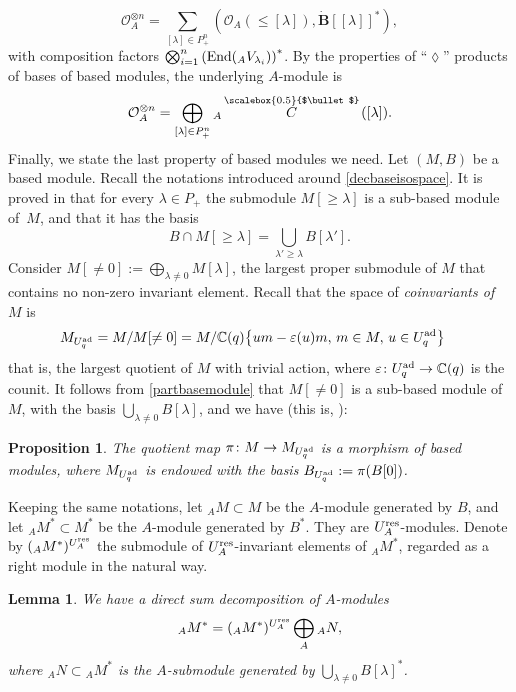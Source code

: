 \documentclass[pdftex]{sigma}
\numberwithin{equation}{section}
\newtheorem{lem}[teo]{Lemma}
\newtheorem{prop}[teo]{Proposition}
\theoremstyle{definition}
\newcommand{\mc}{\mathbb{C}}
\newcommand{\Oo}{{\mathcal O}}
\newcommand{\ra}{\rightarrow}
\newcommand{\smallbullet}{%
\vcenter{\hbox{\,\scalebox{0.5}{$\bullet$}\,}}
}
\begin{document}
\begin{equation}\label{decompositionOAcoad}
\Oo_A^{\otimes n} = \sum_{[\lambda] \in P_+^n} (\Oo_A(\leq [\lambda]), \dot{\mathbf{B}} [[\lambda]]^*),
\end{equation}
with composition factors $ \bigotimes_{i=1}^n \left({\rm End}({}_A V_{\lambda_i})\right)^*$. By the properties of ``$\lozenge$'' products of bases of based modules, the underlying $A$-module is
\begin{equation}\label{decompositionOA2}
\Oo_A^{\otimes n} = \bigoplus_{[\lambda] \in P_+^n} {}_A \overset{\raisebox{-1.5pt}{\scriptsize$\smallbullet$}}{C} ([\lambda]).
\end{equation}
Finally, we state the last property of based modules we need. Let $(M,B)$ be a based module. Recall the notations introduced around \eqref{decbaseisospace}. It is proved in \cite[Proposition 27.1.8]{Lusztig} that for every $\lambda\in P_+$ the submodule $M[\geq\lambda]$ is a sub-based module of~$M$, and that it has the basis
\begin{equation}\label{partbasemodule}
B\cap M[\geq\lambda] = \bigcup_{\lambda'\geq \lambda} B[\lambda'].
\end{equation}
Consider $M[\ne 0] := \bigoplus_{\lambda\ne 0} M[\lambda]$, the largest proper submodule of $M$ that contains no non-zero invariant element. Recall that the space of {\it coinvariants of} $M$ is
\begin{align*} M_{U_q^{\rm ad}} & = M/ M[\ne 0] = M/\mc(q)\big\{um-\varepsilon(u)m, \,m\in M, \,u\in U_q^{\rm ad}\big\}
\end{align*}
that is, the largest quotient of $M$ with trivial action, where $\varepsilon\colon U_q^{\rm ad}\ra \mc(q)$ is the counit. It follows from \eqref{partbasemodule} that $M[\ne 0]$ is a sub-based module of $M$, with the basis $\bigcup_{\lambda\ne 0} B[\lambda]$, and we have (this is, \cite[Proposition~27.2.6]{Lusztig}):
\begin{prop}\label{Linvbased} The quotient map $\pi\colon M \ra M_{U_q^{\rm ad}}$ is a morphism of based modules, where $M_{U_q^{\rm ad}}$ is endowed with the basis $B_{U_q^{\rm ad}} := \pi(B[0])$.
\end{prop}
Keeping the same notations, let ${}_AM \subset M$ be the $A$-module generated by $B$, and let ${{}_AM^* \subset M^*}$ be the $A$-module generated by $B^*$. They are $U_A^{\rm res}$-modules. Denote by $({}_A M^*)^{U_A^{\rm res}}$ the submodule of $U_A^{\rm res}$-invariant elements of ${}_A M^*$, regarded as a right module in the natural way.
\begin{lem} We have a direct sum decomposition of $A$-modules
\begin{equation}\label{decompAcoinv}
{}_A M^* = ({}_A M^*)^{U_A^{\rm res}} \bigoplus_A {}_A N,
\end{equation}
where ${}_A N\subset {}_A M^*$ is the $A$-submodule generated by $\bigcup_{\lambda\ne 0} B[\lambda]^*$.
\end{lem}
\end{document}
